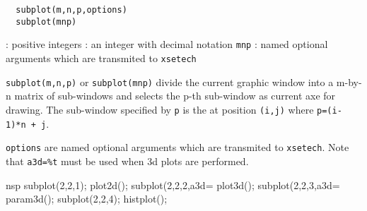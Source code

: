 \begin{mandesc}
\end{mandesc}
\begin{calling_sequence}
\begin{verbatim}
  subplot(m,n,p,options)
  subplot(mnp)
\end{verbatim}
\end{calling_sequence}
\begin{parameters}
  \begin{varlist}
    : positive integers
    : an integer with decimal notation \verb!mnp!
    : named optional arguments which are transmited to \verb!xsetech!
  \end{varlist}
\end{parameters}

\begin{mandescription}
  \verb!subplot(m,n,p)! or \verb!subplot(mnp)! divide the
  current graphic window into a m-by-n matrix of sub-windows and selects the
  p-th sub-window as current axe for drawing.
  The sub-window specified by \verb!p! is the at position \verb!(i,j)! where
  \verb!p=(i-1)*n + j!.

  \verb!options! are named optional arguments which are transmited to \verb!xsetech!.
  Note that \verb!a3d=%t! must be used when 3d plots are performed.
\end{mandescription}

\begin{examples}
  \begin{mintednsp}{nsp}
    subplot(2,2,1);
    plot2d();
    subplot(2,2,2,a3d=%
    plot3d();
    subplot(2,2,3,a3d=%
    param3d();
    subplot(2,2,4);
    histplot();
  \end{mintednsp}
\end{examples}
